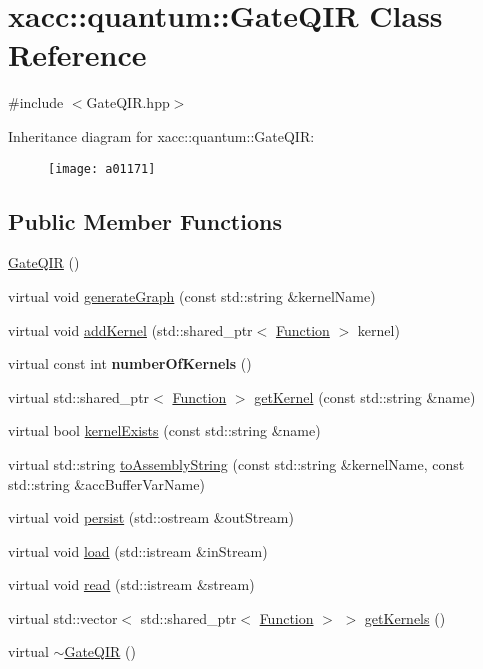 \hypertarget{a01171}{}\section{xacc\+:\+:quantum\+:\+:Gate\+Q\+IR Class Reference}
\label{a01171}


{\ttfamily \#include $<$Gate\+Q\+I\+R.\+hpp$>$}

Inheritance diagram for xacc\+:\+:quantum\+:\+:Gate\+Q\+IR\+:\begin{figure}[H]
\begin{center}
\leavevmode
\texttt{[image: a01171]}
\end{center}
\end{figure}
\subsection*{Public Member Functions}
\begin{DoxyCompactItemize}
\item 
\hyperlink{a01171_afb99f610a6b123538c659169c131a634}{Gate\+Q\+IR} ()
\item 
virtual void \hyperlink{a01171_ad1ddd6105346dd9fc78648fd812285ed}{generate\+Graph} (const std\+::string \&kernel\+Name)
\item 
virtual void \hyperlink{a01171_aa6ed2cf2cbcfec8105c327a4fa95346f}{add\+Kernel} (std\+::shared\+\_\+ptr$<$ \hyperlink{a01475}{Function} $>$ kernel)
\item 
\mbox{\label{a01171_aca6be85526b14f500e7f98954dd6da5c}} 
virtual const int {\bfseries number\+Of\+Kernels} ()
\item 
virtual std\+::shared\+\_\+ptr$<$ \hyperlink{a01475}{Function} $>$ \hyperlink{a01171_a194758b6edcc3ae0c7fe8004f9bfe690}{get\+Kernel} (const std\+::string \&name)
\item 
virtual bool \hyperlink{a01171_a692f95099caa7c024110a3f035941dca}{kernel\+Exists} (const std\+::string \&name)
\item 
virtual std\+::string \hyperlink{a01171_a7153f7e9f516d43af3d5d4f95d60bd86}{to\+Assembly\+String} (const std\+::string \&kernel\+Name, const std\+::string \&acc\+Buffer\+Var\+Name)
\item 
virtual void \hyperlink{a01171_a40e1d07e4dfd3794ef53fca3cdbdca61}{persist} (std\+::ostream \&out\+Stream)
\item 
virtual void \hyperlink{a01171_a07f26eeb362ac480d20da6cdc8c8fb39}{load} (std\+::istream \&in\+Stream)
\item 
virtual void \hyperlink{a01171_a26019e2f1e13e64645e29aee86ac58b1}{read} (std\+::istream \&stream)
\item 
virtual std\+::vector$<$ std\+::shared\+\_\+ptr$<$ \hyperlink{a01475}{Function} $>$ $>$ \hyperlink{a01171_a4ace7ee5ebef84b1f39aaf5ed12c6cc6}{get\+Kernels} ()
\item 
virtual \hyperlink{a01171_ac88db03f1dd29e2d36aaa6c01a130008}{$\sim$\+Gate\+Q\+IR} ()
\end{DoxyCompactItemize}
